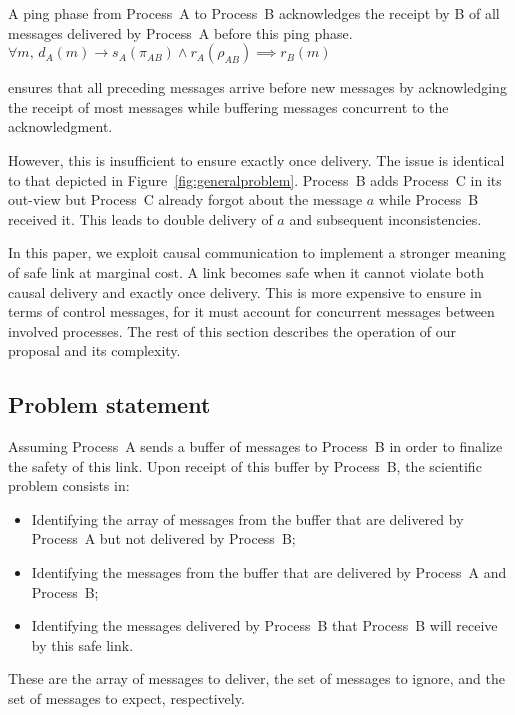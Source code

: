 \begin{lemma}
  A ping phase from Process~A to Process~B acknowledges the receipt by B of all
  messages delivered by Process~A before this ping phase.
  $\forall m,\, d_A(m) \rightarrow s_A(\pi_{AB}) \wedge r_A(\rho_{AB}) \implies
  r_B(m)$
\end{lemma}

\PCBROADCAST ensures that all preceding messages arrive before new messages by
acknowledging the receipt of most messages while buffering messages concurrent
to the acknowledgment.



However, this is insufficient to ensure exactly once delivery. The issue is
identical to that depicted in Figure~\ref{fig:generalproblem}. Process~B adds
Process~C in its out-view but Process~C already forgot about the message $a$
while Process~B received it. This leads to double delivery of $a$ and subsequent
inconsistencies.

In this paper, we exploit causal communication to implement a stronger meaning
of safe link at marginal cost. A link becomes safe when it cannot violate both
causal delivery and exactly once delivery.  This is more expensive to ensure in
terms of control messages, for it must account for concurrent messages between
involved processes. The rest of this section describes the operation of our
proposal and its complexity.


\subsection{Problem statement}

Assuming Process~A sends a buffer of messages to Process~B in order to finalize
the safety of this link. Upon receipt of this buffer by Process~B, the
scientific problem consists in:
\begin{itemize}[leftmargin=*]
\item Identifying the array of messages from the buffer that are delivered by
  Process~A but not delivered by Process~B;
\item Identifying the messages from the buffer that are delivered by Process~A
  and Process~B;
\item Identifying the messages delivered by Process~B that Process~B will
  receive by this safe link.
\end{itemize}
These are the array of messages to deliver, the set of messages to ignore, and
the set of messages to expect, respectively.

